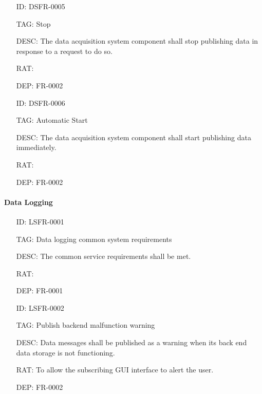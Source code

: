         \begin{itemize}
          \setlength{\itemindent}{.5in}
          \itemsep .15em
          \item[ID:] DSFR-0005
          \item[TAG:] Stop
          \item[DESC:] The data acquisition system component shall stop
            publishing data in response to a request to do so.
          \item[RAT:]
          \item[DEP:] FR-0002
        \end{itemize}

        \begin{itemize}
          \setlength{\itemindent}{.5in}
          \itemsep .15em
          \item[ID:] DSFR-0006
          \item[TAG:] Automatic Start
          \item[DESC:] The data acquisition system component shall start
            publishing data immediately.
          \item[RAT:]
          \item[DEP:] FR-0002
        \end{itemize}

      \paragraph{Data Logging}

        \begin{itemize}
          \setlength{\itemindent}{.5in}
          \itemsep .15em
          \item[ID:] LSFR-0001
          \item[TAG:] Data logging common system requirements
          \item[DESC:] The common service requirements shall be met.
          \item[RAT:]
          \item[DEP:] FR-0001
        \end{itemize}

        \begin{itemize}
          \setlength{\itemindent}{.5in}
          \itemsep .15em
          \item[ID:] LSFR-0002
          \item[TAG:] Publish backend malfunction warning
          \item[DESC:] Data messages shall be published as a warning when its
            back end data storage is not functioning.
          \item[RAT:] To allow the subscribing GUI interface to alert the
            user.
          \item[DEP:] FR-0002
        \end{itemize}

